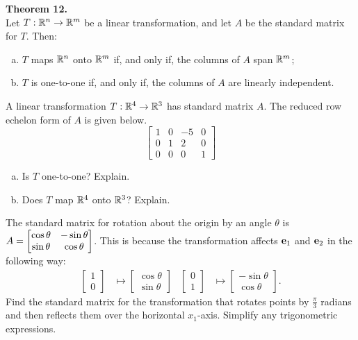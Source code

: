 \begin{boxthm}
	\textbf{Theorem 12.} \\
	Let $T:\mathbb{R}^n\to\mathbb{R}^m$ be a linear transformation, and let $A$ be the standard matrix for $T$. Then:
	\begin{enumerate}[(a)]
		\item $T$ maps $\mathbb{R}^n$ onto $\mathbb{R}^m$ if, and only if, the columns of $A$ span $\mathbb{R}^m$;
		\item $T$ is one-to-one if, and only if, the columns of $A$ are linearly independent.
	\end{enumerate}
\end{boxthm}

\begin{exercise} %
	A linear transformation $T:\mathbb{R}^{4}\to\mathbb{R}^{3}$ has standard matrix $A$. The reduced row echelon form of $A$ is given below.
	$$\begin{bmatrix}1&0&-5&0\\0&1&2&0\\0&0&0&1\end{bmatrix}$$
	\begin{multicols}{2}
		\begin{enumerate}[(a)]
			\item Is $T$ one-to-one? Explain.
			\item Does $T$ map $\mathbb{R}^4$ onto $\mathbb{R}^3$? Explain.
		\end{enumerate}
	\end{multicols}
\end{exercise}
\vfill


\begin{exercise} %
	The standard matrix for rotation about the origin by an angle $\theta$ is $A=\begin{bmatrix}\cos\theta&-\sin\theta\\ \sin\theta&\cos\theta\end{bmatrix}$. This is because the transformation affects $\boldsymbol{\mathbf{e}}_{1}$ and $\boldsymbol{\mathbf{e}}_{2}$ in the following way:
	\begin{align*}
	\begin{bmatrix}1\\0\end{bmatrix} &\mapsto
	\begin{bmatrix} \cos\theta\\ \sin\theta \end{bmatrix} &
	\begin{bmatrix}0\\1\end{bmatrix} &\mapsto
	\begin{bmatrix} -\sin\theta\\ \cos\theta \end{bmatrix}.
	\end{align*}
	Find the standard matrix for the transformation that rotates points by $\frac{\pi}{3}$ radians and then reflects them over the horizontal $x_1$-axis. Simplify any trigonometric expressions.
\end{exercise}
\vfill


\newpage
